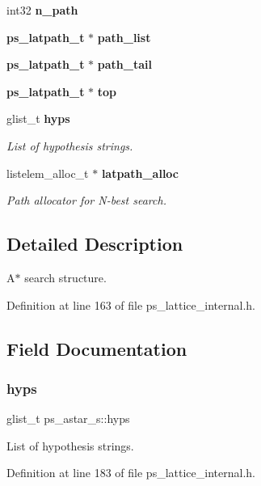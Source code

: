 \begin{DoxyCompactItemize}
int32 {\bfseries n\+\_\+path}
\item 
\mbox{\label{structps__astar__s_a4474da488f4e1545d395c65c39679b8c}} 
\textbf{ ps\+\_\+latpath\+\_\+t} $\ast$ {\bfseries path\+\_\+list}
\item 
\mbox{\label{structps__astar__s_abbfec3e490a6bfd56b75ec419ad9f058}} 
\textbf{ ps\+\_\+latpath\+\_\+t} $\ast$ {\bfseries path\+\_\+tail}
\item 
\mbox{\label{structps__astar__s_aa995e464c2df2594824602e55afb25a8}} 
\textbf{ ps\+\_\+latpath\+\_\+t} $\ast$ {\bfseries top}
\item 
glist\+\_\+t \textbf{ hyps}
\begin{DoxyCompactList}\small\item\em List of hypothesis strings. \end{DoxyCompactList}\item 
listelem\+\_\+alloc\+\_\+t $\ast$ \textbf{ latpath\+\_\+alloc}
\begin{DoxyCompactList}\small\item\em Path allocator for N-\/best search. \end{DoxyCompactList}\end{DoxyCompactItemize}


\subsection{Detailed Description}
A$\ast$ search structure. 

Definition at line 163 of file ps\+\_\+lattice\+\_\+internal.\+h.



\subsection{Field Documentation}
\mbox{\label{structps__astar__s_ace603617a74a81575519ae1bb94720c4}} 
\subsubsection{hyps}
{\footnotesize\ttfamily glist\+\_\+t ps\+\_\+astar\+\_\+s\+::hyps}



List of hypothesis strings. 



Definition at line 183 of file ps\+\_\+lattice\+\_\+internal.\+h.



